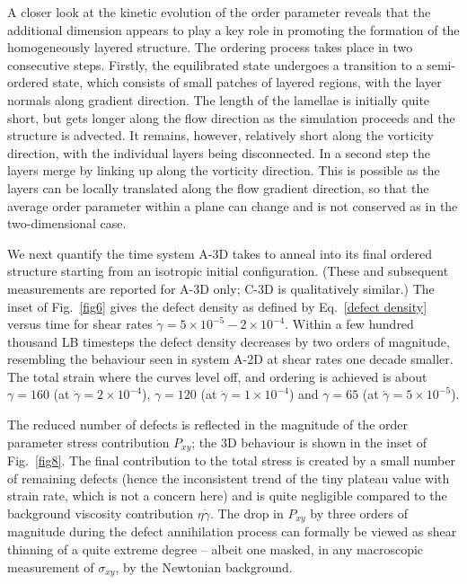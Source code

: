 \documentclass[8.5pt,twoside,twocolumn]{article}
\begin{document}
{A closer look at the kinetic evolution of the order parameter reveals that the additional dimension appears to play a key role in promoting the formation of the homogeneously layered structure.
The ordering process takes place in two consecutive steps.
Firstly, the equilibrated state undergoes a transition to a semi-ordered state, which consists of small patches of layered regions, with the layer normals along gradient direction.
The length of the lamellae is initially quite short, but gets longer along the flow direction as the simulation proceeds and the structure is advected. It remains, however, relatively short along the vorticity direction, with the individual layers being disconnected.
In a second step the layers merge by linking up along the vorticity direction. This is possible as the layers can be locally translated along the flow gradient direction, so that the average order parameter within a plane can change and is not conserved as in the two-dimensional case. }

We next quantify the time system A-3D takes to anneal into its final ordered structure starting from an isotropic initial configuration. (These and subsequent measurements are reported for A-3D only; C-3D is qualitatively similar.)  
The inset of Fig.~\ref{fig6} gives the defect density as defined by Eq.~\ref{defect density} versus time for shear rates $\dot{\gamma}=5\times10^{-5}-2\times10^{-4}$. 
Within a few hundred thousand LB timesteps the defect density decreases by two orders of magnitude, resembling the behaviour seen in system A-2D at shear rates one decade smaller.
The total strain where the curves level off, and ordering is achieved is about $\gamma=160$ (at $\dot{\gamma}=2\times10^{-4}$), $\gamma=120$ (at $\dot{\gamma}=1\times10^{-4}$) and $\gamma=65$ (at $\dot{\gamma}=5\times10^{-5}$).

The reduced number of defects is reflected in the magnitude of the order parameter stress contribution $P_{xy}$; the 3D behaviour is shown in the inset of Fig.~\ref{fig8}. The final contribution to the total stress is created by a small number of remaining defects (hence the inconsistent trend of the tiny plateau value with strain rate, which is not a concern here) and is quite negligible compared to the background viscosity contribution $\eta\dot\gamma$. The drop in $P_{xy}$ by three orders of magnitude during the defect annihilation process can formally be viewed as shear thinning of a quite extreme degree -- albeit one masked, in any macroscopic measurement of $\sigma_{xy}$, by the Newtonian background. 
\end{document}
